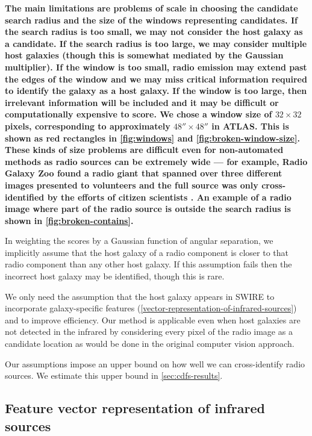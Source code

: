 \documentclass[fleqn,usenatbib,usedcolumn]{mnras}
\newcommand{\edited}[1]{{\bf {#1}}}
\begin{document}
    \edited{The main limitations are problems of scale in choosing the
    candidate search radius and the size of the windows
    representing candidates. If the search radius is too small, we may not
    consider the host galaxy as a candidate. If the search radius is too
    large, we may consider multiple host galaxies (though this is somewhat
    mediated by the Gaussian multiplier). If the window is too small, radio
    emission may extend past the edges of the window and we may miss critical
    information required to identify the galaxy as a host galaxy. If the
    window is too large, then irrelevant information will be included and it
    may be difficult or computationally expensive to score. We chose a
    window size of $32 \times 32$ pixels, corresponding to approximately $48'' \times 48''$ in
    ATLAS. This is shown as red rectangles in \autoref{fig:windows} and
    \autoref{fig:broken-window-size}. These kinds of size problems are
    difficult even for non-automated methods as radio sources can be extremely
    wide --- for example, Radio Galaxy Zoo found a radio giant that spanned
    over three different images presented to volunteers and the full source
    was only cross-identified by the efforts of citizen scientists
    \citep{banfield15}. An example of a radio image where part of the radio
    source is outside the search radius is shown in
    \autoref{fig:broken-contains}.}

    In weighting the scores by a Gaussian function of angular
    separation, we implicitly assume that the host galaxy of a radio component
    is closer to that radio component than any other host galaxy. If this
    assumption fails then the incorrect host galaxy may be identified, though
    this is rare.

    We only need the assumption that the host galaxy appears in SWIRE to
    incorporate galaxy-specific features
    (\autoref{vector-representation-of-infrared-sources}) and to improve
    efficiency. Our method is applicable even when host galaxies are not detected in
    the infrared by considering every pixel of the radio image as a candidate
    location as would be done in the original computer vision approach.

    Our assumptions impose an upper bound on how well we can cross-identify
    radio sources. We estimate this upper bound in \autoref{sec:cdfs-results}.

  \subsection{Feature vector representation of infrared sources}
  \label{vector-representation-of-infrared-sources}
\end{document}
